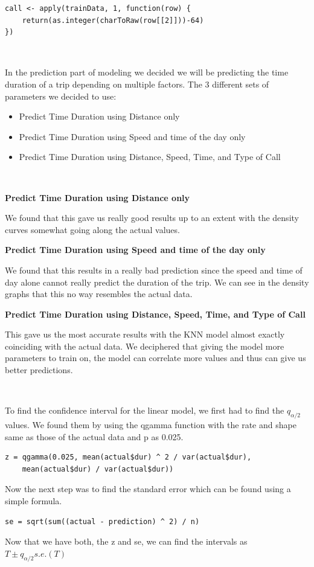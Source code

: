 \documentclass[11pt]{article}
\begin{document}
\begin{lstlisting}
call <- apply(trainData, 1, function(row) {
	return(as.integer(charToRaw(row[[2]]))-64)
})
\end{lstlisting}

\\
\par
In the prediction part of modeling we decided we will be predicting the time duration of a trip depending on multiple factors. The 3 different sets of parameters we decided to use:
\begin{itemize}
	\item Predict Time Duration using Distance only
	\item Predict Time Duration using Speed and time of the day only
	\item Predict Time Duration using Distance, Speed, Time, and Type of Call
\end{itemize}

\\
\par
\textbf{Predict Time Duration using Distance only}
\par
We found that this gave us really good results up to an extent with the density curves somewhat going along the actual values.

\textbf{Predict Time Duration using Speed and time of the day only}
\par
We found that this results in a really bad prediction since the speed and time of day alone cannot really predict the duration of the trip. We can see in the density graphs that this no way resembles the actual data.

\textbf{Predict Time Duration using Distance, Speed, Time, and Type of Call}
\par
This gave us the most accurate results with the KNN model almost exactly coinciding with the actual data. We deciphered that giving the model more parameters to train on, the model can correlate more values and thus can give us better predictions.

\\
\par
To find the confidence interval for the linear model, we first had to find the $q_{\alpha/2}$ values. We found them by using the qgamma function with the rate and shape same as those of the actual data and p as 0.025.
\begin{lstlisting}
z = qgamma(0.025, mean(actual$dur) ^ 2 / var(actual$dur), 
    mean(actual$dur) / var(actual$dur))
\end{lstlisting}
\par
Now the next step was to find the standard error which can be found using a simple formula.
\begin{lstlisting}
se = sqrt(sum((actual - prediction) ^ 2) / n)
\end{lstlisting}
Now that we have both, the z and se, we can find the intervals as $T \pm q_{\alpha/2} s.e.(T)$
\end{document}
